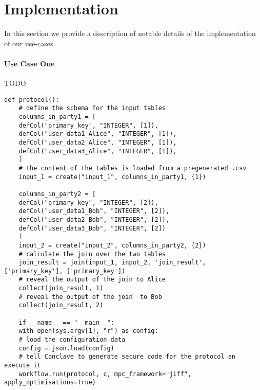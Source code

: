 \section{Implementation}
In this section we provide a description of notable details of the implementation of our use-cases. 

\paragraph{Use Case One}
TODO
\begin{lstlisting}[caption={ The Python protocol of Conclave for our first use-case    }]
	def protocol():
	# define the schema for the input tables 
	columns_in_party1 = [
	defCol("primary_key", "INTEGER", [1]),
	defCol("user_data1_Alice", "INTEGER", [1]),
	defCol("user_data2_Alice", "INTEGER", [1]),
	defCol("user_data3_Alice", "INTEGER", [1]),
	]
	# the content of the tables is loaded from a pregenerated .csv
	input_1 = create("input_1", columns_in_party1, {1})
	
	columns_in_party2 = [
	defCol("primary_key", "INTEGER", [2]),
	defCol("user_data1_Bob", "INTEGER", [2]),
	defCol("user_data2_Bob", "INTEGER", [2]),
	defCol("user_data3_Bob", "INTEGER", [2])
	]
	input_2 = create("input_2", columns_in_party2, {2})
	# calculate the join over the two tables 
	join_result = join(input_1, input_2, 'join_result', ['primary_key'], ['primary_key'])
	# reveal the output of the join to Alice
	collect(join_result, 1)
	# reveal the output of the join  to Bob
	collect(join_result, 2)
	
	if __name__ == "__main__":
	with open(sys.argv[1], "r") as config:
	# load the configuration data
	config = json.load(config)
	# tell Conclave to generate secure code for the protocol an execute it
	workflow.run(protocol, c, mpc_framework="jiff", apply_optimisations=True)
\end{lstlisting}

